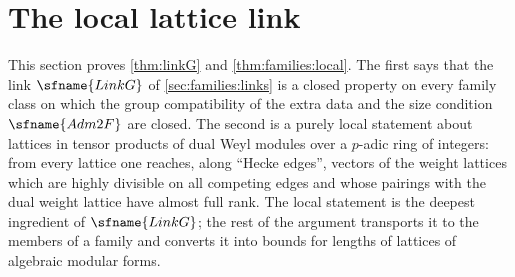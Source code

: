 \section{The local lattice link}\label{sec:pf:linkG}

\providecommand{\linkGV}{\mathcal V}
\providecommand{\linkGH}{\mathcal H}
\providecommand{\linkGR}{\mathcal R}
\providecommand{\linkGNs}{N^{\mathrm{src}}}
\providecommand{\linkGNt}{N^{\mathrm{tgt}}}
\providecommand{\linkGLP}{\mathsf{LP}}
\providecommand{\linkGLPat}{\mathsf{LP}_{\mathrm{at}}}
\providecommand{\linkGGR}{\mathsf{GR}}
\providecommand{\linkGLL}{\mathsf{LL}}
\providecommand{\linkGEF}{\mathsf{EF}}
\providecommand{\linkGST}{\mathsf{ST}}
\providecommand{\linkGES}{\mathsf{ES}}
\providecommand{\linkGAB}{\mathsf{AB}}
\providecommand{\linkGst}{\mathrm{st}}
\providecommand{\linkGVV}{\mathit{VV}}
\providecommand{\linkGgain}{\mathrm{gain}}
\providecommand{\linkGlen}{\ell}

This section proves \cref{thm:linkG} and \cref{thm:families:local}. The first says that the link
$\sfname{LinkG}$ of \cref{sec:families:links} is a closed property on every family class on which the group
compatibility of the extra data and the size condition $\sfname{Adm2F}$ are closed. The second is a purely local
statement about lattices in tensor products of dual Weyl modules over a $p$-adic ring of integers: from every
lattice one reaches, along ``Hecke edges'', vectors of the weight lattices which are highly divisible on all
competing edges and whose pairings with the dual weight lattice have almost full rank. The local statement is the
deepest ingredient of $\sfname{LinkG}$; the rest of the argument transports it to the members of a family and
converts it into bounds for lengths of lattices of algebraic modular forms.

